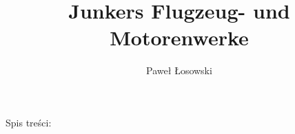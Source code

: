 \documentclass{beamer}
\title{Junkers Flugzeug- und Motorenwerke}
\author{Paweł Łosowski}
\begin{document}
\begin{frame}
    \titlepage
\end{frame}

\begin{frame}{Spis treści:}
    \tableofcontents
\end{frame}





\end{document}
